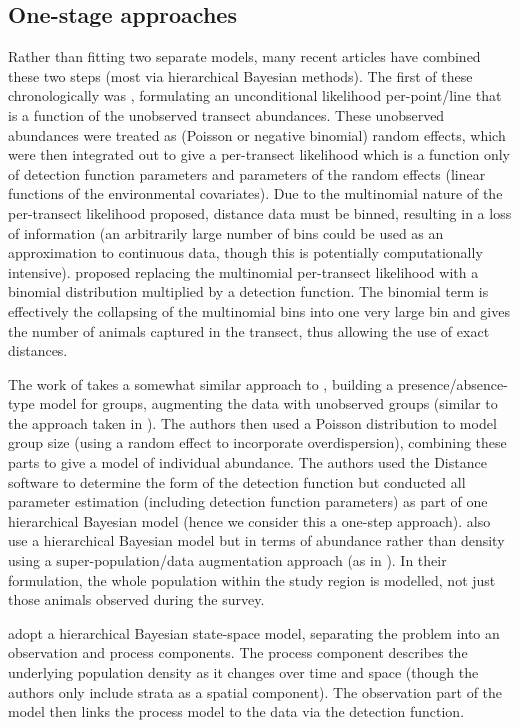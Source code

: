 \documentclass[a4paper,12pt]{article}
\begin{document}
\subsection*{One-stage approaches}

Rather than fitting two separate models, many recent articles have combined these two steps (most via hierarchical Bayesian methods). The first of these chronologically was \cite{Royle:2004tu}, formulating an unconditional likelihood per-point/line that is a function of the unobserved transect abundances. These unobserved abundances were treated as (Poisson or negative binomial) random effects, which were then integrated out to give a per-transect likelihood which is a function only of detection function parameters and parameters of the random effects (linear functions of the environmental covariates). Due to the multinomial nature of the per-transect likelihood proposed, distance data must be binned, resulting in a loss of information (an arbitrarily large number of bins could be used as an approximation to continuous data, though this is potentially computationally intensive). \cite{Chelgren:2011us} proposed replacing the multinomial per-transect likelihood with a binomial distribution multiplied by a detection function. The binomial term is effectively the collapsing of the multinomial bins into one very large bin and gives the number of animals captured in the transect, thus allowing the use of exact distances.

The work of \cite{Schmidt:2011ec} takes a somewhat similar approach to \cite{Royle:2008wc}, building a presence/absence-type model for groups, augmenting the data with unobserved groups (similar to the approach taken in \cite{Royle:2008wc}). The authors then used a Poisson distribution to model group size (using a random effect to incorporate overdispersion), combining these parts to give a model of individual abundance. The authors used the Distance software \citep{Thomas:2010cf} to determine the form of the detection function but conducted all parameter estimation (including detection function parameters) as part of one hierarchical Bayesian model (hence we consider this a one-step approach). \cite{Conn:2012bx} also use a hierarchical Bayesian model but in terms of abundance rather than density using a super-population/data augmentation approach (as in \cite{Link:2009wv}). In their formulation, the whole population within the study region is modelled, not just those animals observed during the survey.

\cite{Moore:2011jf} adopt a hierarchical Bayesian state-space model, separating the problem into an observation and process components. The process component describes the underlying population density as it changes over time and space (though the authors only include strata as a spatial component). The observation part of the model then links the process model to the data via the detection function. 
\end{document}
